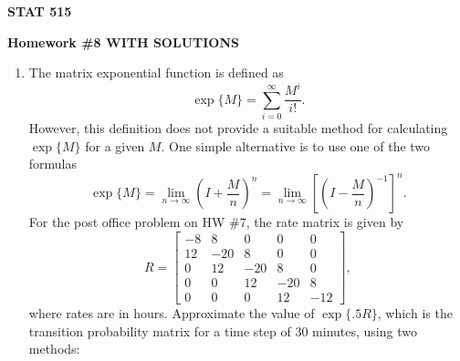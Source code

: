 \documentclass{article}
\begin{document}
\begin{center}
{\bf STAT 515}

{\bf Homework \#8 WITH SOLUTIONS}

\end{center}

\begin{enumerate}

  \item The matrix exponential function is defined as
  \[
  \exp\{ M \} = \sum_{i=0}^\infty \frac{M^i}{i!}.
  \]
  However, this definition does not provide a suitable method for calculating
  $\exp\{M\}$ for a given $M$. One simple alternative is to use one of the two
  formulas
  \[
  \exp \{ M \} = \lim_{n\to\infty} \left( I + \frac{M}{n} \right) ^n
  = \lim_{n\to\infty} \left[ \left(I - \frac{M}{n} \right)^{-1} \right]^n.
  \]
  For the post office problem on HW \#7, the rate matrix is given by
  \[
  R = \begin{bmatrix}
  -8 & 8 & 0 & 0 & 0 \\
  12 & -20 & 8 & 0 & 0 \\
  0 & 12 & -20 & 8 & 0 \\
  0 & 0 & 12 & -20 & 8 \\
  0 & 0 & 0 & 12 & -12
  \end{bmatrix},
  \]
  where rates are in hours. Approximate the value of $\exp \{.5R\}$, which is
  the transition probability matrix for a time step of 30 minutes, using two
  methods:

    \begin{enumerate}


\end{enumerate}
\end{enumerate}
\end{document}

